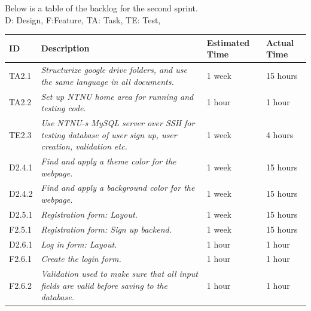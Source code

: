Below is a table of the backlog for the second sprint. \\ D: Design, F:Feature, TA: Task, TE: Test, 

\begin{minipage}{\linewidth}
\setlength{\tabcolsep}{12pt}
\centering
{}
\begin{tabular}{|p{1cm}|p{4cm}|p{2cm}|p{2cm}|}
\hline
\cellcolor{gray!25} ID & \cellcolor{gray!25} Description & \cellcolor{gray!25} Estimated Time & \cellcolor{gray!25} Actual Time \\
\hline
TA2.1 & \it{Structurize google drive folders, and use the same language in all documents.} & 1 week & 15 hours \\
TA2.2 & \it{Set up NTNU home area for running and testing code.} & 1 hour & 1 hour \\
TE2.3 & \it{Use NTNU-s MySQL server over SSH for testing database of user sign up, user creation, validation etc. } & 1 week & 4 hours \\
D2.4.1 & \it{Find and apply a theme color for the webpage. } & 1 week & 15 hours \\
D2.4.2 & \it{Find and apply a background color for the webpage.} & 1 week & 15 hours \\
D2.5.1 & \it{Registration form: Layout.} & 1 week & 15 hours \\
F2.5.1 & \it{Registration form: Sign up backend.} & 1 week & 15 hours \\
D2.6.1 & \it{Log in form: Layout.} & 1 hour & 1 hour \\
F2.6.1 & \it{Create the login form.} & 1 hour & 1 hour \\
F2.6.2 & \it{Validation used to make sure that all input fields are valid before saving to the database. } & 1 hour & 1 hour \\
\hline
\end{tabular}
\end{minipage}

